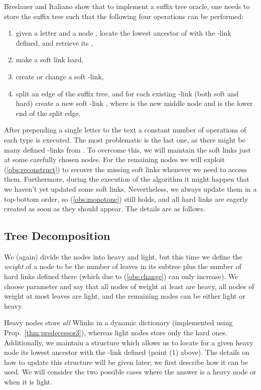 \documentclass[11pt,onecolumn,final]{article} \usepackage{a4}
\theoremstyle{plain}
\theoremstyle{remark}
\begin{document}
Breslauer and Italiano show that to implement a suffix tree oracle, one needs to store the suffix tree such that the following four operations can be performed:

\begin{enumerate}
\item given a letter  and a node , locate the lowest ancestor  of  with the -link defined, and retrieve its ,
\item make a soft link hard,
\item create or change a soft -link,
\item split an edge  of the suffix tree, and for each existing -link  (both soft and hard) create a new soft -link , where  is the new middle node and  is the lower end of the split edge.
\end{enumerate}

After prepending a single letter to the text a constant number of operations of each type is executed.
The most problematic is the last one, as
there might be many defined -links from . To overcome this, we will maintain the soft links just at some carefully chosen nodes. For the remaining nodes we will exploit (\ref{obs:reconstruct}) to recover the missing soft links whenever we need to access them. Furthermore, during the execution of the algorithm it might happen that we haven't yet updated some soft links. Nevertheless, we always update them in a top-bottom order, so (\ref{obs:monotone}) still holds, and all hard links are eagerly created as soon as they should appear. The details are as follows.

\subsection{Tree Decomposition}
We (again) divide the nodes into heavy and light, but this time we define the \emph{weight} of a node to be the number of leaves in its subtree plus the number of hard links defined there (which due to (\ref{obs:change}) can only increase). We choose parameter  and say that all nodes of weight at least  are heavy, all nodes of weight at most  leaves are light, and the remaining nodes can be either light or heavy.

Heavy nodes store \emph{all} Wlinks in a dynamic dictionary (implemented using Prop.~\ref{thm:predecessor3}), whereas light nodes store only the hard ones. Additionally, we maintain a structure which allows us to locate for a given heavy node  its lowest ancestor  with the -link defined (point (1) above). The details on how to update this structure will be given later; we first describe how it can be used. We will consider the two possible cases where the answer is a heavy node or when it is light.
\end{document}
